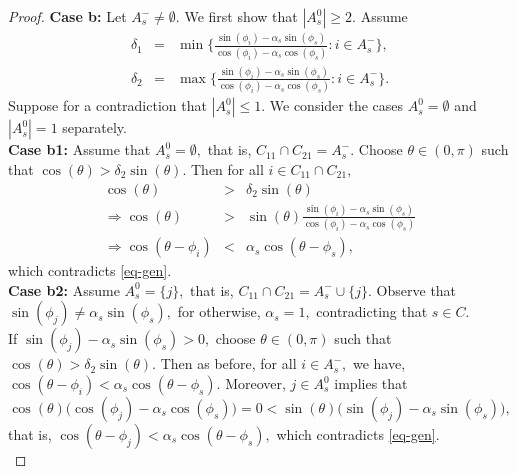 \documentclass{amsart}
\theoremstyle{definition}
\theoremstyle{remark}
\numberwithin{equation}{section}
\begin{document}
\begin{proof}
	\textbf{Case b:} Let  $A_s^-\neq\emptyset.$ We first show that $|A_s^0|\geq 2.$   Assume
	\begin{eqnarray*}
		\delta_1&=&\min\Big\{\frac{\sin(\phi_i)-\alpha_s \sin(\phi_s)}{\cos(\phi_i)-\alpha_s \cos(\phi_s)}:i\in A_s^-\Big\}, \\
		\delta_2&=&\max\Big\{\frac{\sin(\phi_i)-\alpha_s \sin(\phi_s)}{\cos(\phi_i)-\alpha_s \cos(\phi_s)}:i\in A_s^-\Big\}.
	\end{eqnarray*}
	Suppose for a contradiction that $|A_s^0|\leq 1.$ We consider the cases $A_s^0=\emptyset$ and  $|A_s^0|= 1$ separately. \\
	
	\textbf{Case b1:} Assume that $A_s^0=\emptyset,$ that is, $C_{11}\cap C_{21}=A_s^-.$ Choose $\theta\in (0,\pi)$ such that $\cos(\theta)>\delta_2 \sin(\theta).$ Then for all $i\in C_{11}\cap C_{21},$
	\begin{eqnarray*}
		\cos(\theta)&>&\delta_2 \sin(\theta)\\
		\Rightarrow \cos(\theta)&>& \sin(\theta) \frac{\sin(\phi_i)-\alpha_s \sin(\phi_s)}{\cos(\phi_i)-\alpha_s \cos(\phi_s)}\\
		\Rightarrow \cos(\theta-\phi_i)&<&\alpha_s\cos(\theta-\phi_s),
	\end{eqnarray*}
	which contradicts \eqref{eq-gen}.\\
	
	\textbf{Case b2:} Assume $A_s^0=\{j\},$ that is, $C_{11}\cap C_{21}=A_s^-\cup \{j\}.$ Observe that  $\sin(\phi_j)\neq \alpha_s\sin(\phi_s),$ for otherwise, $\alpha_s=1,$ contradicting that $s\in C.$\\
	
	If $\sin(\phi_j)- \alpha_s\sin(\phi_s)>0,$ choose $\theta\in (0,\pi)$ such that $\cos(\theta)>\delta_2 \sin(\theta).$ Then as before, for all $i\in A_s^-,$ we have, $\cos(\theta-\phi_i)<\alpha_s\cos(\theta-\phi_s).$ Moreover, $j\in A_s^0$ implies that 
	\[ \cos(\theta)\Big(\cos(\phi_j)-\alpha_s \cos(\phi_s)\Big)=0<\sin(\theta) \Big(\sin(\phi_j)-\alpha_s \sin(\phi_s)\Big),\]
	that is, $\cos(\theta-\phi_j)<\alpha_s\cos(\theta-\phi_s),$ %
	which contradicts \eqref{eq-gen}.\\
	

\end{proof}
\end{document}
